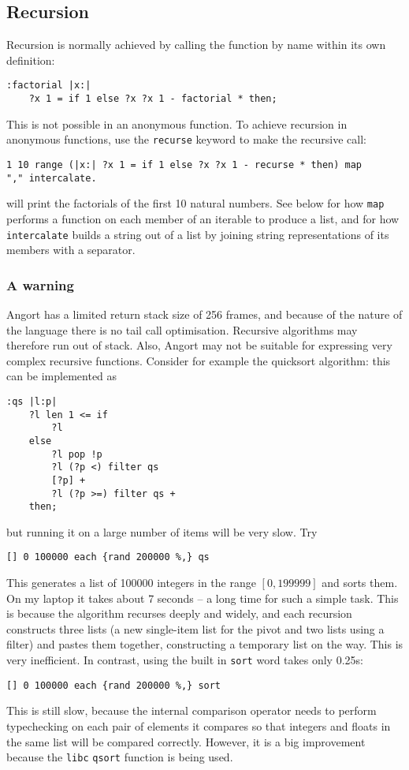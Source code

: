 \subsection{Recursion}
Recursion is normally achieved by calling the function by name within
its own definition:
\begin{lstlisting}
:factorial |x:|
    ?x 1 = if 1 else ?x ?x 1 - factorial * then;
\end{lstlisting}
This is not possible in an anonymous function. To achieve recursion
in anonymous functions, use the
\texttt{recurse} keyword to make the recursive call:
\begin{lstlisting}
1 10 range (|x:| ?x 1 = if 1 else ?x ?x 1 - recurse * then) map
"," intercalate.
\end{lstlisting}
will print the factorials of the first 10 natural numbers. See below
for how \texttt{map} performs a function on each member of an iterable
to produce a list, and for how \texttt{intercalate} builds a string
out of a list by joining string representations of its members with
a separator.
\subsubsection{A warning}
Angort has a limited return stack size of 256 frames, and because of the nature
of the language there is no tail call optimisation. Recursive algorithms
may therefore run out of stack. Also, Angort may not be suitable for expressing
very complex recursive functions. Consider for example the quicksort algorithm:
this can be implemented as
\begin{lstlisting}
:qs |l:p| 
    ?l len 1 <= if 
        ?l 
    else 
        ?l pop !p 
        ?l (?p <) filter qs 
        [?p] + 
        ?l (?p >=) filter qs + 
    then;
\end{lstlisting}
but running it on a large number of items will be very slow. Try
\begin{lstlisting}
[] 0 100000 each {rand 200000 %,} qs
\end{lstlisting}
This generates a list of 100000 integers in the range $[0,199999]$ and
sorts them. On my laptop it takes about 7 seconds -- a long time for
such a simple task.
This is because the algorithm recurses deeply and widely,
and each recursion constructs 
three lists (a new single-item list for the pivot and two lists
using a filter) and pastes them together, constructing a temporary 
list on the way. This is very inefficient.
In contrast, using the built in \texttt{sort} word takes only 0.25s:
\begin{lstlisting}
[] 0 100000 each {rand 200000 %,} sort
\end{lstlisting}
This is still slow, because the internal comparison operator
needs to perform typechecking on each pair of elements it compares
so that integers and floats in the same list will be compared
correctly. However, it is a big improvement because the \texttt{libc} 
\texttt{qsort} function is being used.


